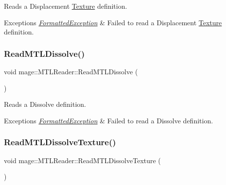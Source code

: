 Reads a Displacement \hyperlink{classmage_1_1_texture}{Texture} definition.


\begin{DoxyExceptions}{Exceptions}
{\em \hyperlink{structmage_1_1_formatted_exception}{Formatted\+Exception}} & Failed to read a Displacement \hyperlink{classmage_1_1_texture}{Texture} definition. \\
\hline
\end{DoxyExceptions}
\hypertarget{classmage_1_1_m_t_l_reader_a788a80ec60a2e50c1017630afb607f1c}{}\label{classmage_1_1_m_t_l_reader_a788a80ec60a2e50c1017630afb607f1c} 
\subsubsection{\texorpdfstring{Read\+M\+T\+L\+Dissolve()}{ReadMTLDissolve()}}
{\footnotesize\ttfamily void mage\+::\+M\+T\+L\+Reader\+::\+Read\+M\+T\+L\+Dissolve (\begin{DoxyParamCaption}{ }\end{DoxyParamCaption})\hspace{0.3cm}{\ttfamily [private]}}

Reads a Dissolve definition.


\begin{DoxyExceptions}{Exceptions}
{\em \hyperlink{structmage_1_1_formatted_exception}{Formatted\+Exception}} & Failed to read a Dissolve definition. \\
\hline
\end{DoxyExceptions}
\hypertarget{classmage_1_1_m_t_l_reader_aae7a327ad0c5223041c9e849ea2a88d7}{}\label{classmage_1_1_m_t_l_reader_aae7a327ad0c5223041c9e849ea2a88d7} 
\subsubsection{\texorpdfstring{Read\+M\+T\+L\+Dissolve\+Texture()}{ReadMTLDissolveTexture()}}
{\footnotesize\ttfamily void mage\+::\+M\+T\+L\+Reader\+::\+Read\+M\+T\+L\+Dissolve\+Texture (\begin{DoxyParamCaption}{ }\end{DoxyParamCaption})\hspace{0.3cm}{\ttfamily [private]}}

